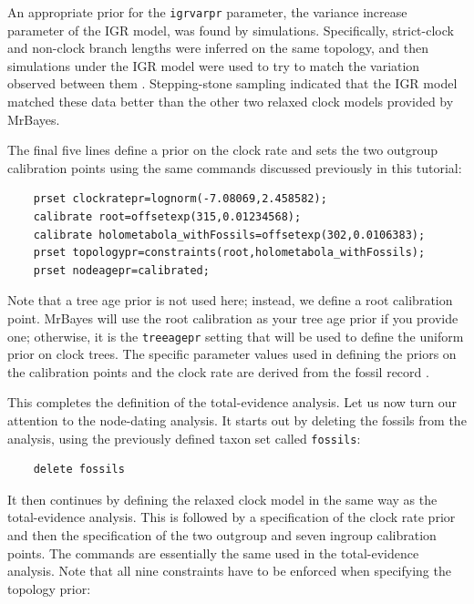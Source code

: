 \documentclass[12pt]{book}
\newcommand{\ttt}[1]{\texttt{#1}}
\begin{document}
An appropriate prior for the \ttt{igrvarpr} parameter, the variance increase parameter of the IGR
model, was found by simulations. Specifically, strict-clock and non-clock branch lengths were
inferred on the same topology, and then simulations under the IGR model were used to try to match
the variation observed between them \citep{ronquist12b}. Stepping-stone sampling indicated that the
IGR model matched these data better than the other two relaxed clock models provided by MrBayes.

The final five lines define a prior on the clock rate and sets the two outgroup calibration points
using the same commands discussed previously in this tutorial:

\begin{singlespacing}
\begin{verbatim}
    prset clockratepr=lognorm(-7.08069,2.458582);
    calibrate root=offsetexp(315,0.01234568);
    calibrate holometabola_withFossils=offsetexp(302,0.0106383);
    prset topologypr=constraints(root,holometabola_withFossils);
    prset nodeagepr=calibrated;
\end{verbatim}
\end{singlespacing}

Note that a tree age prior is not used here; instead, we define a root calibration point. MrBayes
will use the root calibration as your tree age prior if you provide one; otherwise, it is the
\ttt{treeagepr} setting that will be used to define the uniform prior on clock trees. The specific
parameter values used in defining the priors on the calibration points and the clock rate are
derived from the fossil record \citep{ronquist12b}.

This completes the definition of the total-evidence analysis. Let us now turn our attention to the
node-dating analysis. It starts out by deleting the fossils from the analysis, using the
previously defined taxon set called \ttt{fossils}:

\begin{verbatim}
    delete fossils
\end{verbatim}

It then continues by defining the relaxed clock model in the same way as the total-evidence
analysis. This is followed by a specification of the clock rate prior and then the specification of
the two outgroup and seven ingroup calibration points. The commands are essentially the same used
in the total-evidence analysis. Note that all nine constraints have to be enforced when specifying
the topology prior:
\end{document}
